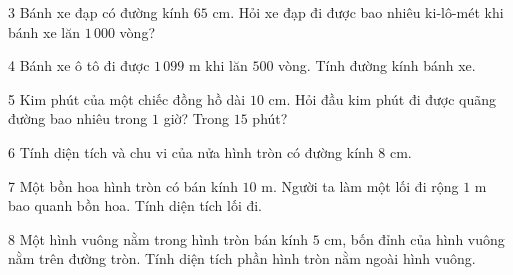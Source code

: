 \gap
\begin{probbox}{3}{\relax}
Bánh xe đạp có đường kính $65$ cm. Hỏi xe đạp đi được bao nhiêu ki-lô-mét khi bánh xe lăn $1\,000$ vòng?
\end{probbox}
\gap
\begin{probbox}{4}{\relax}
Bánh xe ô tô đi được $1\,099$ m khi lăn $500$ vòng. Tính đường kính bánh xe.
\end{probbox}
\gap
\begin{probbox}{5}{\relax}
Kim phút của một chiếc đồng hồ dài $10$ cm. Hỏi đầu kim phút đi được quãng đường bao nhiêu trong $1$ giờ? Trong $15$ phút?
\end{probbox}
\gap
\begin{probbox}{6}{\relax}
Tính diện tích và chu vi của nửa hình tròn có đường kính $8$ cm.
\end{probbox}
\gap
\begin{probbox}{7}{\relax}
Một bồn hoa hình tròn có bán kính $10$ m. Người ta làm một lối đi rộng $1$ m bao quanh bồn hoa. Tính diện tích lối đi.
\end{probbox}
\gap
\begin{probbox}{8}{\relax}
Một hình vuông nằm trong hình tròn bán kính $5$ cm, bốn đỉnh của hình vuông nằm trên đường tròn. Tính diện tích phần hình tròn nằm ngoài hình vuông.
\end{probbox}
